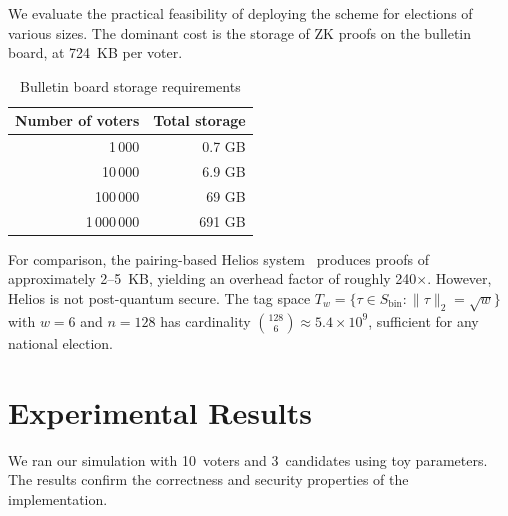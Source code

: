 \documentclass[a4paper]{article}
\begin{document}
We evaluate the practical feasibility of deploying the scheme for elections of various sizes. The dominant cost is the storage of ZK proofs on the bulletin board, at 724~KB per voter.

\begin{table}[H]
    \centering
    \caption{Bulletin board storage requirements}
    \label{tab:scalability}
    \begin{tabular}{rr}
        \toprule
        \textbf{Number of voters} & \textbf{Total storage} \\
        \midrule
        1\,000                    & 0.7 GB                 \\
        10\,000                   & 6.9 GB                 \\
        100\,000                  & 69 GB                  \\
        1\,000\,000               & 691 GB                 \\
        \bottomrule
    \end{tabular}
\end{table}

For comparison, the pairing-based Helios system~\cite{Helios09} produces proofs of approximately 2--5~KB, yielding an overhead factor of roughly 240$\times$. However, Helios is not post-quantum secure.
The tag space $T_w = \{\tau \in S_{\text{bin}} : \|\tau\|_2 = \sqrt{w}\}$ with $w = 6$ and $n = 128$ has cardinality $\binom{128}{6} \approx 5.4 \times 10^9$, sufficient for any national election.


\section{Experimental Results}

We ran our simulation with 10~voters and 3~candidates using toy parameters. The results confirm the correctness and security properties of the implementation.
\end{document}
